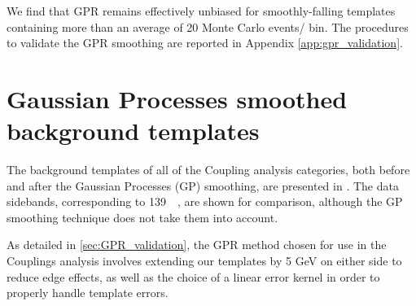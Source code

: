 We find that GPR remains effectively unbiased for smoothly-falling templates containing more than an average of 20 Monte Carlo events/ bin. The procedures to validate the GPR smoothing are reported in Appendix \ref{app:gpr_validation}.

\section{Gaussian Processes smoothed background templates}
\label{sec:GPR_templates}

The background templates of all of the Coupling analysis categories, both before and after the Gaussian Processes (GP) smoothing, are presented in \Figrange{\ref{fig:gpr_coupcat_1}}{\ref{fig:gpr_coupcat_22}}. The data sidebands, corresponding to \SI{139}{\per\fb}, are shown for comparison, although the GP smoothing technique does not take them into account.

As detailed in \ref{sec:GPR_validation}, the GPR method chosen for use in the Couplings analysis involves extending our templates by 5 GeV on either side to reduce edge effects, as well as the choice of a linear error kernel in order to properly handle template errors.

